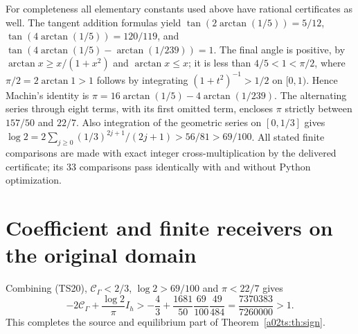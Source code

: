 For completeness all elementary constants used above have rational
certificates as well. The tangent addition formulas yield
$\tan(2\arctan(1/5))=5/12$,
$\tan(4\arctan(1/5))=120/119$, and
$\tan(4\arctan(1/5)-\arctan(1/239))=1$.
The final angle is positive, by
$\arctan x\geq x/(1+x^2)$ and $\arctan x\leq x$;
it is less than $4/5<1<\pi/2$, where
$\pi/2=2\arctan1>1$ follows by integrating $(1+t^2)^{-1}>1/2$
on $[0,1)$. Hence Machin's identity is
$\pi=16\arctan(1/5)-4\arctan(1/239)$.
The alternating series through eight terms, with its first omitted
term, encloses $\pi$ strictly between $157/50$ and $22/7$.
Also integration of the geometric series on $[0,1/3]$ gives
$\log2=2\sum_{j\geq0}(1/3)^{2j+1}/(2j+1)>56/81>69/100$.
All stated finite comparisons are made with exact integer
cross-multiplication by the delivered certificate; its 33 comparisons
pass identically with and without Python optimization.

\section{Coefficient and finite receivers on the original domain}
Combining (TS20), $\mathcal C_\Gamma<2/3$, $\log2>69/100$ and
$\pi<22/7$ gives
\begin{equation}\tag{TS36}
 -2\mathcal C_\Gamma+\frac{\log2}{\pi}I_h
 >-\frac43+\frac{1681}{50}\frac{69}{100}\frac{49}{484}
 =\frac{7370383}{7260000}>1.
\end{equation}
This completes the source and equilibrium part of Theorem~\ref{a02ts:th:sign}.


